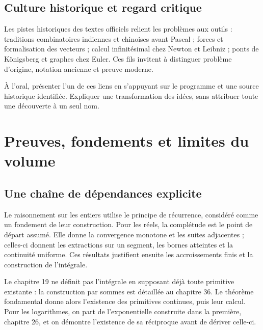 \section{Culture historique et regard critique}
Les pistes historiques des textes officiels relient les problèmes aux outils : traditions combinatoires indiennes et chinoises avant Pascal ; forces et formalisation des vecteurs ; calcul infinitésimal chez Newton et Leibniz ; ponts de Königsberg et graphes chez Euler. Ces fils invitent à distinguer problème d'origine, notation ancienne et preuve moderne.

À l'oral, présenter l'un de ces liens en s'appuyant sur le programme et une source historique identifiée. Expliquer une transformation des idées, sans attribuer toute une découverte à un seul nom.

\chapter{Preuves, fondements et limites du volume}
\section{Une chaîne de dépendances explicite}
Le raisonnement sur les entiers utilise le principe de récurrence, considéré comme un fondement de leur construction. Pour les réels, la complétude est le point de départ assumé. Elle donne la convergence monotone et les suites adjacentes ; celles-ci donnent les extractions sur un segment, les bornes atteintes et la continuité uniforme. Ces résultats justifient ensuite les accroissements finis et la construction de l'intégrale.

Le chapitre 19 ne définit pas l'intégrale en supposant déjà toute primitive existante : la construction par sommes est détaillée au chapitre 36. Le théorème fondamental donne alors l'existence des primitives continues, puis leur calcul. Pour les logarithmes, on part de l'exponentielle construite dans la première, chapitre 26, et on démontre l'existence de sa réciproque avant de dériver celle-ci.
